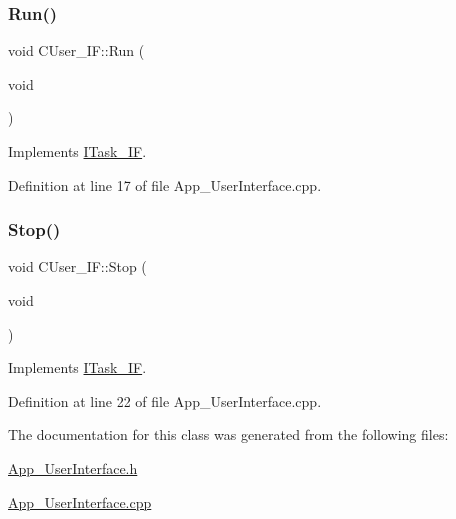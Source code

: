 \subsubsection{\texorpdfstring{Run()}{Run()}}
{\footnotesize\ttfamily void C\+User\+\_\+\+I\+F\+::\+Run (\begin{DoxyParamCaption}\item[{void}]{ }\end{DoxyParamCaption})\hspace{0.3cm}{\ttfamily [virtual]}}



Implements \mbox{\hyperlink{class_i_task___i_f_ab73cc5879a61d00fc59b72cce32cc6f7}{I\+Task\+\_\+\+IF}}.



Definition at line 17 of file App\+\_\+\+User\+Interface.\+cpp.

\mbox{\label{class_c_user___i_f_ae241b3296f4dd7810897ed8631ede880}} 
\subsubsection{\texorpdfstring{Stop()}{Stop()}}
{\footnotesize\ttfamily void C\+User\+\_\+\+I\+F\+::\+Stop (\begin{DoxyParamCaption}\item[{void}]{ }\end{DoxyParamCaption})\hspace{0.3cm}{\ttfamily [virtual]}}



Implements \mbox{\hyperlink{class_i_task___i_f_af5f8fba86704c7e36d0e4681d58300c6}{I\+Task\+\_\+\+IF}}.



Definition at line 22 of file App\+\_\+\+User\+Interface.\+cpp.



The documentation for this class was generated from the following files\+:\begin{DoxyCompactItemize}
\item 
\mbox{\hyperlink{_app___user_interface_8h}{App\+\_\+\+User\+Interface.\+h}}\item 
\mbox{\hyperlink{_app___user_interface_8cpp}{App\+\_\+\+User\+Interface.\+cpp}}\end{DoxyCompactItemize}

